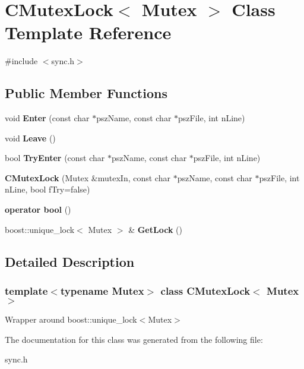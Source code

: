 \hypertarget{class_c_mutex_lock}{}\section{C\+Mutex\+Lock$<$ Mutex $>$ Class Template Reference}
\label{class_c_mutex_lock}


{\ttfamily \#include $<$sync.\+h$>$}

\subsection*{Public Member Functions}
\begin{DoxyCompactItemize}
\item 
\mbox{\label{class_c_mutex_lock_a8a9f734c76f1b766445bec41b91393dd}} 
void {\bfseries Enter} (const char $\ast$psz\+Name, const char $\ast$psz\+File, int n\+Line)
\item 
\mbox{\label{class_c_mutex_lock_ade2d9e399a2cfcaabe0667fc954f7435}} 
void {\bfseries Leave} ()
\item 
\mbox{\label{class_c_mutex_lock_a9ba3770fa3e256a183b0ee52ebf048c4}} 
bool {\bfseries Try\+Enter} (const char $\ast$psz\+Name, const char $\ast$psz\+File, int n\+Line)
\item 
\mbox{\label{class_c_mutex_lock_ad08e2df1cad4c5732dafb1552abe6106}} 
{\bfseries C\+Mutex\+Lock} (Mutex \&mutex\+In, const char $\ast$psz\+Name, const char $\ast$psz\+File, int n\+Line, bool f\+Try=false)
\item 
\mbox{\label{class_c_mutex_lock_a4358803c87a873252abebdd1b625d293}} 
{\bfseries operator bool} ()
\item 
\mbox{\label{class_c_mutex_lock_a1c36fd4b70dea1908280eea6b752d3d3}} 
boost\+::unique\+\_\+lock$<$ Mutex $>$ \& {\bfseries Get\+Lock} ()
\end{DoxyCompactItemize}


\subsection{Detailed Description}
\subsubsection*{template$<$typename Mutex$>$\newline
class C\+Mutex\+Lock$<$ Mutex $>$}

Wrapper around boost\+::unique\+\_\+lock$<$\+Mutex$>$ 

The documentation for this class was generated from the following file\+:\begin{DoxyCompactItemize}
\item 
sync.\+h\end{DoxyCompactItemize}
